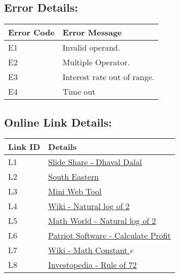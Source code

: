 \documentclass{article}
\begin{document}
\subsection{Error Details:}
\begin{table}[h!]
    \begin{tabular}{|| l || l || }
        \hline
        Error Code & Error Message \\
        \hline
        E1 & Invalid operand. \\ 
        \hline
        E2 & Multiple Operator. \\ 
        \hline
        E3 & Interest rate out of range. \\ 
        \hline
        E4 & Time out \\ 
        \hline
    \end{tabular}
\end{table}
\newpage
\subsection{Online Link Details:}
\begin{table}[h!]
    \begin{tabular}{|| l || l || }
        \hline
        Link ID & Details \\
        \hline
        L1 & \href{http://www.slideshare.net/DhavalDalal/calculator-stories}{Slide Share - Dhaval Dalal} \\ 
        \hline
        L2 &  \href{http://www2.southeastern.edu/Academics/Faculty/dgurney/Math241/StatTopics/SciNot.htm}{South Eastern} \\
        \hline
        L3 & \href{http://www.miniwebtool.com/}{Mini Web Tool} \\ 
        \hline
        L4 & \href{https://en.wikipedia.org/wiki/Natural_logarithm_of_2}{Wiki - Natural log of 2} \\ 
        \hline
        L5 & \href{http://mathworld.wolfram.com/NaturalLogarithmof2.html}{Math World - Natural log of 2} \\ 
        \hline
        L6 & \href{https://www.patriotsoftware.com/accounting/training/blog/how-do-you-determine-a-profit-margin/}{Patriot Software - Calculate Profit} \\ 
        \hline
        L7 & \href{https://en.wikipedia.org/wiki/E_(mathematical_constant)}{Wiki - Math Constant $e$} \\ 
        \hline
        L8 & \href{https://www.investopedia.com/terms/r/ruleof72.asp}{Investopedia - Rule of 72} \\ 
        \hline
    \end{tabular}
\end{table}
\end{document}

